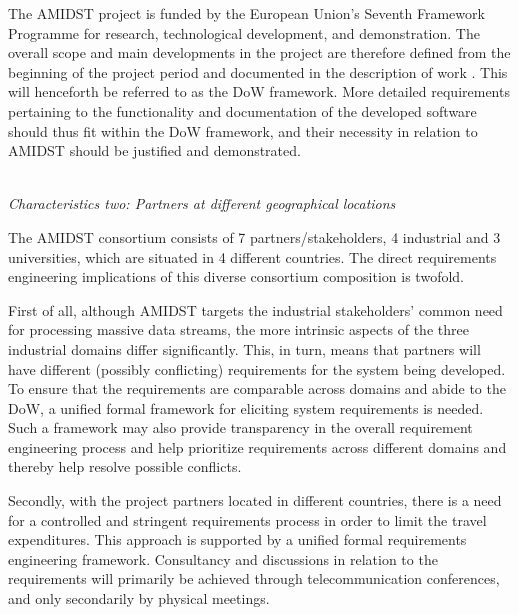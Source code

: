 The AMIDST project is funded by the European Union's Seventh Framework Programme for research, technological
development, and demonstration. The overall scope and main developments in the project are therefore defined from the
beginning of the project period and documented in the description of work \cite{}. This will henceforth be referred to
as the DoW framework. More detailed requirements pertaining
to the functionality and documentation of the developed software should thus fit within the DoW framework, and their
necessity in relation to AMIDST should be justified and demonstrated.   


 


\ \\
\noindent \emph{Characteristics two: Partners at different geographical locations}
\label{sec:characteristic2}

The AMIDST consortium consists of 7 partners/stakeholders, 4 industrial and 3 universities, which are situated in 4 different
countries. The direct requirements engineering implications of this diverse consortium composition is twofold. 

First of
all, although AMIDST targets the industrial stakeholders' common need for processing massive data streams, the more
intrinsic aspects of the three industrial domains differ significantly. This, in turn, means that partners will have different
(possibly conflicting) requirements for the system being developed. To ensure that the requirements are comparable
across domains and abide to the DoW, a unified formal framework for eliciting system requirements is needed. Such a
framework may also provide transparency in the overall requirement engineering process and help prioritize requirements
across different domains and thereby help resolve possible conflicts.   

Secondly, with the project partners located in different countries, there is a need for a controlled and stringent requirements
process in order to limit the travel expenditures. This approach is supported by a unified formal requirements
engineering framework. Consultancy and discussions in relation to the
requirements will primarily be achieved through telecommunication conferences, and only secondarily by physical meetings. 
 
